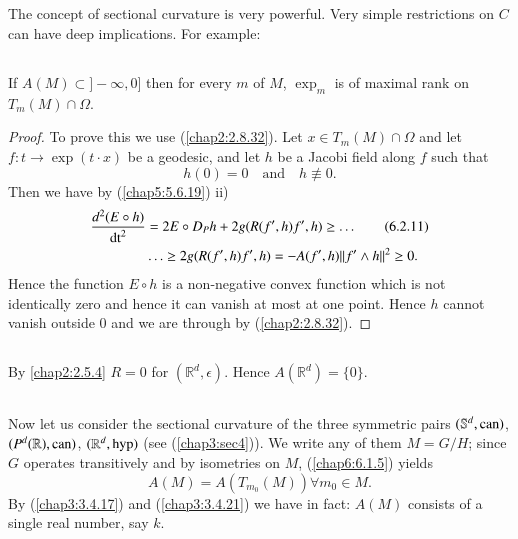 \subsection{}\label{chap6:6.2.8}
The concept of sectional curvature is very powerful. Very simple
restrictions on $C$ can have deep implications. For example:

\setcounter{subsection}{8}

\subsection{}\label{chap6:6.2.9}

\begin{prop*}
If $A(M)\subset ]-\infty,0]$ then for every $m$ of $M$, $\exp_{m}$ is
    of maximal rank on $T_{m}(M)\cap \Omega$.
\end{prop*}

\begin{proof}
To prove this we use (\ref{chap2:2.8.32}). Let \pageoriginale $x\in
T_{m}(M)\cap \Omega$ and let $f:t\to \exp(t\cdot x)$ be a geodesic,
and let $h$ be a Jacobi field along $f$ such that
\begin{equation*}
h(0)=0\quad\text{and}\quad h\not\equiv 0.\tag{6.2.10}\label{chap6:6.2.10}
\end{equation*}
Then we have by (\ref{chap5:5.6.19}) ii)
\begin{align*}
\frac{d^{2}(E\circ h)}{\operatorname{dt}^{2}} &= 2E\circ
D_{P}h+2g(R(f',h)f',h)\geq\ldots\tag{6.2.11}\label{chap6:6.2.11}\\
&\ldots\geq 2g(R(f',h)f',h)=-A(f',h)||f'\wedge h||^{2}\geq 0.
\end{align*}
Hence the function $E\circ h$ is a non-negative convex function which
is not identically zero and hence it can vanish at most at one
point. Hence $h$ cannot vanish outside $0$ and we are through by
(\ref{chap2:2.8.32}).
\end{proof}

\setcounter{subsection}{11}
\subsection{}\label{chap6:6.2.12}
By \ref{chap2:2.5.4} $R=0$ for $(\mathbb{R}^{d},\epsilon)$. Hence
$A(\mathbb{R}^{d})=\{0\}$. 

\subsection{}\label{chap6:6.2.13}
Now let us consider the sectional curvature of the three symmetric
pairs $(\mathbb{S}^{d},\operatorname{can})$, $(P^{d}(\mathbb{R}),\operatorname{can})$,
$(\mathbb{R}^{d},\operatorname{hyp})$ (see (\ref{chap3:sec4})). We write any of them
$M=G/H$; since $G$ operates transitively and by isometries on $M$, 
(\ref{chap6:6.1.5}) yields
\begin{equation*}
A(M)=A(T_{m_{0}}(M))\forall m_{0}\in M.\tag{6.2.14}\label{chap6:6.2.14}
\end{equation*}
By (\ref{chap3:3.4.17}) and (\ref{chap3:3.4.21}) we have in fact: $A(M)$
consists of a single real number, say $k$.

